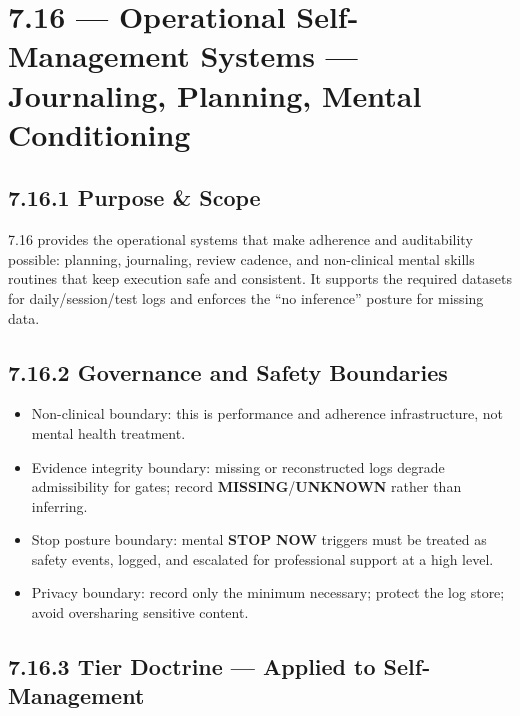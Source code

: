 \documentclass[10pt]{article}
\begin{document}
\section*{7.16 — Operational Self-Management Systems — Journaling, Planning, Mental Conditioning}
{}

\subsection*{7.16.1 Purpose \& Scope}
{}

7.16 provides the operational systems that make adherence and auditability possible: planning, journaling, review cadence, and non-clinical mental skills routines that keep execution safe and consistent. It supports the required datasets for daily/session/test logs and enforces the “no inference” posture for missing data.

\subsection*{7.16.2 Governance and Safety Boundaries}
{}

\begin{itemize}
\item Non-clinical boundary: this is performance and adherence infrastructure, not mental health treatment.
\item Evidence integrity boundary: missing or reconstructed logs degrade admissibility for gates; record \textbf{MISSING}/\textbf{UNKNOWN} rather than inferring.
\item Stop posture boundary: mental \textbf{STOP} \textbf{NOW} triggers must be treated as safety events, logged, and escalated for professional support at a high level.
\item Privacy boundary: record only the minimum necessary; protect the log store; avoid oversharing sensitive content.
\end{itemize}

\subsection*{7.16.3 Tier Doctrine — Applied to Self-Management}
{}
\end{document}
